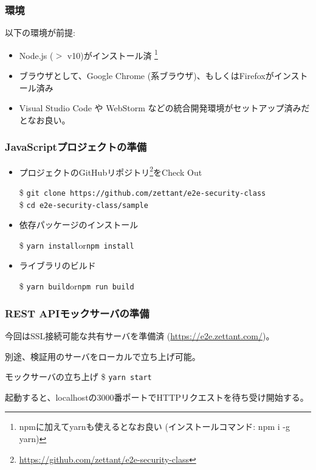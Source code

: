 \documentclass[12pt,dvipdfmx]{beamer}
\begin{document}
\begin{frame}
\frametitle{環境}
以下の環境が前提:
\begin{itemize}
 \item Node.js ($>$ v10)がインストール済 \footnote[frame]{npmに加えてyarnも使えるとなお良い (インストールコマンド: npm i -g yarn)}
 \item ブラウザとして、Google Chrome (系ブラウザ)、もしくはFirefoxがインストール済み
 \item Visual Studio Code や WebStorm などの統合開発環境がセットアップ済みだとなお良い。
\end{itemize}
\end{frame}

\begin{frame}
\frametitle{JavaScriptプロジェクトの準備}
\begin{itemize}
\item プロジェクトのGitHubリポジトリ\footnote[frame]{\url{https://github.com/zettant/e2e-security-class}}をCheck Out\\
\begin{exampleblock}{}
\footnotesize
\$ \texttt{git clone https://github.com/zettant/e2e-security-class}\\
\$ \texttt{cd e2e-security-class/sample}
\end{exampleblock}
\item 依存パッケージのインストール
\begin{exampleblock}{}
\$ \texttt{yarn install}\quad or\quad \texttt{npm install}
\end{exampleblock}
\item ライブラリのビルド
\begin{exampleblock}{}
\$ \texttt{yarn build}\quad or\quad \texttt{npm run build}
\end{exampleblock}
\end{itemize}
\end{frame}

\begin{frame}
\frametitle{REST APIモックサーバの準備}
今回はSSL接続可能な共有サーバを準備済 (\url{https://e2e.zettant.com/})。

\vspace{2ex}

別途、検証用のサーバをローカルで立ち上げ可能。
\begin{exampleblock}{\small モックサーバの立ち上げ}
\$ \texttt{yarn start}
\end{exampleblock}
起動すると、localhostの3000番ポートでHTTPリクエストを待ち受け開始する。
\end{frame}
\end{document}
